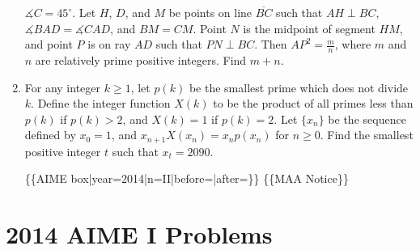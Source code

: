 \documentclass{article}
\begin{document}
\begin{enumerate}[label=\arabic*., itemsep=0.5em]
\(\measuredangle C=45^{\circ}\). Let \(H\), \(D\), and \(M\) be points on line \(\overline{BC}\) such that \(AH\perp BC\), \(\measuredangle BAD=\measuredangle CAD\), and \(BM=CM\). Point \(N\) is the midpoint of segment \(HM\), and point \(P\) is on ray \(AD\) such that \(PN\perp BC\). Then \(AP^2=\frac{m}{n}\), where \(m\) and \(n\) are relatively prime positive integers. Find \(m+n\).\par \vspace{0.5em}\item For any integer \(k\geq 1\), let \(p(k)\) be the smallest prime which does not divide \(k\). Define the integer function \(X(k)\) to be the product of all primes less than \(p(k)\) if \(p(k)>2\), and \(X(k)=1\) if \(p(k)=2\). Let \(\{x_n\}\) be the sequence defined by \(x_0=1\), and \(x_{n+1}X(x_n)=x_np(x_n)\) for \(n\geq 0\). Find the smallest positive integer \(t\) such that \(x_t=2090\). 



\{\{AIME box|year=2014|n=II|before=|after=\}\}
\{\{MAA Notice\}\}\par \vspace{0.5em}
\end{enumerate}
\newpage\section*{2014 AIME I Problems}
\end{document}
